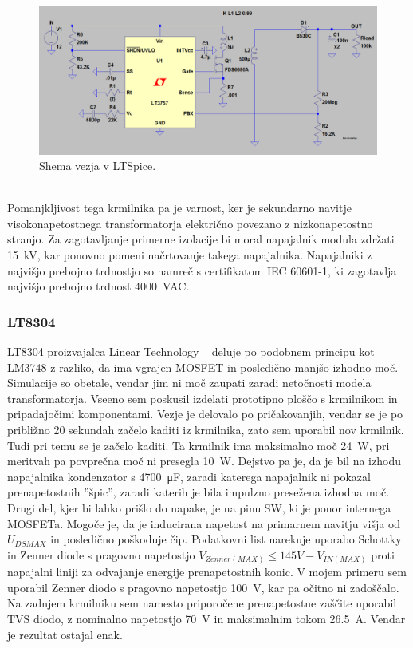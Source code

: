 \documentclass[a4paper,twoside,openright,12pt,Slovene]{book}
\begin{document}
    \begin{figure}[H]
        \centering
        \includegraphics[width=1\columnwidth]{Slike/Simulacije/LM3757spice.png}
        \caption{\label{LM3757spice} Shema vezja v LTSpice.}
    \end{figure}
    
~\\Pomanjkljivost tega krmilnika pa je varnost, ker je sekundarno navitje visokonapetostnega transformatorja električno povezano z nizkonapetostno stranjo. Za zagotavljanje primerne izolacije bi moral napajalnik modula zdržati \SI{15}{\kilo\volt}, kar ponovno pomeni načrtovanje takega napajalnika. Napajalniki z najvišjo prebojno trdnostjo so namreč s certifikatom IEC 60601-1, ki zagotavlja najvišjo prebojno trdnost \SI{4000}{\volt}AC.

	\subsubsection{LT8304} \label{LT8304}
LT8304 proizvajalca Linear Technology ~\cite{analog:LT8304} deluje po podobnem principu kot LM3748 z razliko, da ima vgrajen MOSFET in posledično manjšo izhodno moč. Simulacije so obetale, vendar jim ni moč zaupati zaradi netočnosti modela transformatorja. Vseeno sem poskusil izdelati prototipno ploščo s krmilnikom in pripadajočimi komponentami. Vezje je delovalo po pričakovanjih, vendar se je po približno 20 sekundah začelo kaditi iz krmilnika, zato sem uporabil nov krmilnik.
Tudi pri temu se je začelo kaditi. Ta krmilnik ima maksimalno moč \SI{24}{\watt}, pri meritvah pa povprečna moč ni presegla \SI{10}{\watt}. Dejstvo pa je, da je bil na izhodu napajalnika kondenzator s \SI{4700}{\micro\farad}, zaradi katerega napajalnik ni pokazal prenapetostnih ''špic'', zaradi katerih je bila impulzno presežena izhodna moč. Drugi del, kjer bi lahko prišlo do napake, je na pinu SW, ki je ponor internega MOSFETa. Mogoče je, da je inducirana napetost na primarnem navitju višja od \(U_{DS MAX}\) in posledično poškoduje čip. Podatkovni list narekuje uporabo Schottky in Zenner diode s pragovno napetostjo \(V_{Zenner(MAX)} \leq 145 V - V_{IN(MAX)}\) proti napajalni liniji za odvajanje energije prenapetostnih konic. V mojem primeru sem uporabil Zenner diodo s pragovno napetostjo \SI{100}{\volt}, kar pa očitno ni zadoščalo. Na zadnjem krmilniku sem namesto priporočene prenapetostne zaščite uporabil TVS diodo, z nominalno napetostjo \SI{70}{\volt} in maksimalnim tokom \SI{26,5}{\ampere}. Vendar je rezultat ostajal enak.
\end{document}
